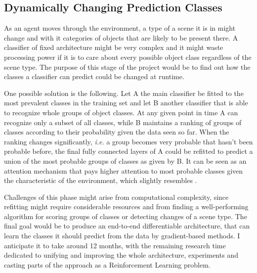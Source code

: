 \documentclass[12pt]{article}
\begin{document}
\subsection{Dynamically Changing Prediction Classes}

As an agent moves through the environment, a type of a scene it is in might change and with it categories of objects that are likely to be present there. A classifier of fixed architecture might be very complex and it might waste processing power if it is to care about every possible object class regardless of the scene type. The purpose of this stage of the project would be to find out how the classes a classifier can predict could be changed at runtime.

One possible solution is the following. Let A the main classifier be fitted to the most prevalent classes in the training set and let B another classifier that is able to recognize whole groups of object classes. At any given point in time A can recognize only a subset of all classes, while B maintains a ranking of groups of classes according to their probability given the data seen so far. When the ranking changes significantly, \emph{i.e.} a group becomes very probable that hasn't been probable before, the final fully connected layers of A could be refitted to predict a union of the most probable groups of classes as given by B. It can be seen as an attention mechanism that pays higher attention to most probable classes given the characteristic of the environment, which slightly resembles \cite{memory}.

Challenges of this phase might arise from computational complexity, since refitting might require considerable resources and from finding a well-performing algorithm for scoring groups of classes or detecting changes of a scene type. The final goal would be to produce an end-to-end differentiable architecture, that can learn the classes it should predict from the data by gradient-based methods. I anticipate it to take around 12 months, with the remaining research time dedicated to unifying and improving the whole architecture, experiments and casting parts of the approach as a Reinforcement Learning problem. 



\end{document}
